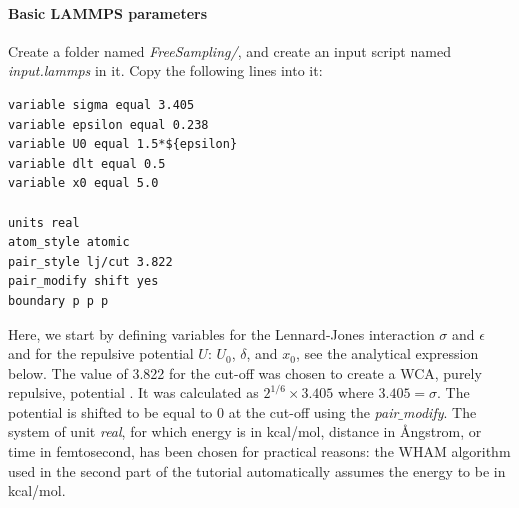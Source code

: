 \documentclass[9pt,tutorial]{livecoms}
\begin{document}
\paragraph{Basic LAMMPS parameters}
\noindent Create a folder named \textit{FreeSampling/}, and create an input script named \textit{input.lammps} in it. Copy the following lines into it:
{\normalsize \begin{verbatim}
variable sigma equal 3.405
variable epsilon equal 0.238
variable U0 equal 1.5*${epsilon}
variable dlt equal 0.5
variable x0 equal 5.0

units real
atom_style atomic
pair_style lj/cut 3.822
pair_modify shift yes
boundary p p p
\end{verbatim}}
Here, we start by defining variables for the Lennard-Jones interaction $\sigma$ and $\epsilon$ and for the repulsive potential $U$: $U_0$, $\delta$, and $x_0$, see the analytical expression below. The value of 3.822 for the cut-off was chosen to create a WCA, purely repulsive, potential \cite{weeks1971role}. It was calculated as $2^{1/6} \times 3.405$ where $3.405 = \sigma$. The potential is shifted to be equal to 0 at the cut-off using the \textit{pair$\_$modify}. The system of unit \textit{real}, for which energy is in kcal/mol, distance in Ångstrom, or time in femtosecond, has been chosen for practical reasons: the WHAM algorithm used in the second part of the tutorial automatically assumes the energy to be in kcal/mol.
\end{document}
